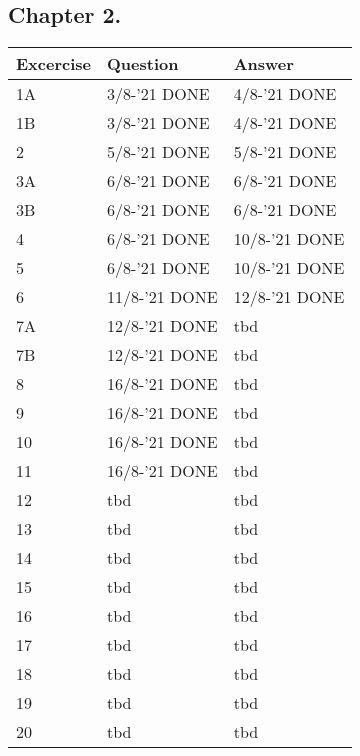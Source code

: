 \subsection*{Chapter 2.}
\begin{tabular}{|l|l|l|}
    \hline
    \rowcolor[HTML]{EFEFEF}
    {\color[HTML]{000000} Excercise } & {\color[HTML]{000000} Question } & {\color[HTML]{000000} Answer } \\ \hline
    1A & 3/8-'21 DONE & 4/8-'21 DONE \\ \hline
    1B & 3/8-'21 DONE & 4/8-'21 DONE \\ \hline
    2 & 5/8-'21 DONE & 5/8-'21 DONE \\ \hline
    3A & 6/8-'21 DONE & 6/8-'21 DONE \\ \hline
    3B & 6/8-'21 DONE & 6/8-'21 DONE \\ \hline
    4 & 6/8-'21 DONE & 10/8-'21 DONE \\ \hline
    5 & 6/8-'21 DONE & 10/8-'21 DONE \\ \hline
    6 & 11/8-'21 DONE & 12/8-'21 DONE \\ \hline
    7A & 12/8-'21 DONE & tbd \\ \hline
    7B & 12/8-'21 DONE & tbd \\ \hline
    8 & 16/8-'21 DONE & tbd \\ \hline
    9 & 16/8-'21 DONE & tbd \\ \hline
    10 & 16/8-'21 DONE & tbd \\ \hline
    11 & 16/8-'21 DONE & tbd \\ \hline
    12 & tbd & tbd \\ \hline
    13 & tbd & tbd \\ \hline
    14 & tbd & tbd \\ \hline
    15 & tbd & tbd \\ \hline
    16 & tbd & tbd \\ \hline
    17 & tbd & tbd \\ \hline
    18 & tbd & tbd \\ \hline
    19 & tbd & tbd \\ \hline
    20 & tbd & tbd \\ \hline
\end{tabular}
